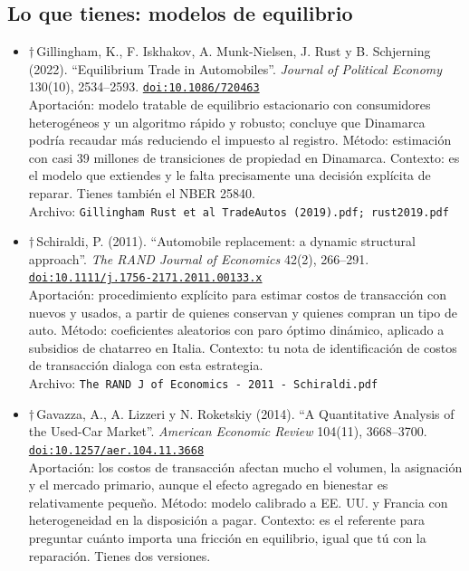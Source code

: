 \documentclass[11pt]{article}
\begin{document}
\subsection*{Lo que tienes: modelos de equilibrio}
\begin{itemize}
\item $\dagger$\,Gillingham, K., F. Iskhakov, A. Munk-Nielsen, J. Rust y B. Schjerning (2022). ``Equilibrium Trade in Automobiles''. \textit{Journal of Political Economy} 130(10), 2534--2593. \href{https://doi.org/10.1086/720463}{\texttt{doi:10.1086/720463}}\\
Aportación: modelo tratable de equilibrio estacionario con consumidores heterogéneos y un algoritmo rápido y robusto; concluye que Dinamarca podría recaudar más reduciendo el impuesto al registro. Método: estimación con casi 39 millones de transiciones de propiedad en Dinamarca. Contexto: es el modelo que extiendes y le falta precisamente una decisión explícita de reparar. Tienes también el NBER 25840.\\
{\footnotesize Archivo: \texttt{Gillingham Rust et al TradeAutos (2019).pdf; rust2019.pdf}}
\item $\dagger$\,Schiraldi, P. (2011). ``Automobile replacement: a dynamic structural approach''. \textit{The RAND Journal of Economics} 42(2), 266--291. \href{https://doi.org/10.1111/j.1756-2171.2011.00133.x}{\texttt{doi:10.1111/j.1756-2171.2011.00133.x}}\\
Aportación: procedimiento explícito para estimar costos de transacción con nuevos y usados, a partir de quienes conservan y quienes compran un tipo de auto. Método: coeficientes aleatorios con paro óptimo dinámico, aplicado a subsidios de chatarreo en Italia. Contexto: tu nota de identificación de costos de transacción dialoga con esta estrategia.\\
{\footnotesize Archivo: \texttt{The RAND J of Economics - 2011 - Schiraldi.pdf}}
\item $\dagger$\,Gavazza, A., A. Lizzeri y N. Roketskiy (2014). ``A Quantitative Analysis of the Used-Car Market''. \textit{American Economic Review} 104(11), 3668--3700. \href{https://doi.org/10.1257/aer.104.11.3668}{\texttt{doi:10.1257/aer.104.11.3668}}\\
Aportación: los costos de transacción afectan mucho el volumen, la asignación y el mercado primario, aunque el efecto agregado en bienestar es relativamente pequeño. Método: modelo calibrado a EE. UU. y Francia con heterogeneidad en la disposición a pagar. Contexto: es el referente para preguntar cuánto importa una fricción en equilibrio, igual que tú con la reparación. Tienes dos versiones.\\

\end{itemize}
\end{document}
